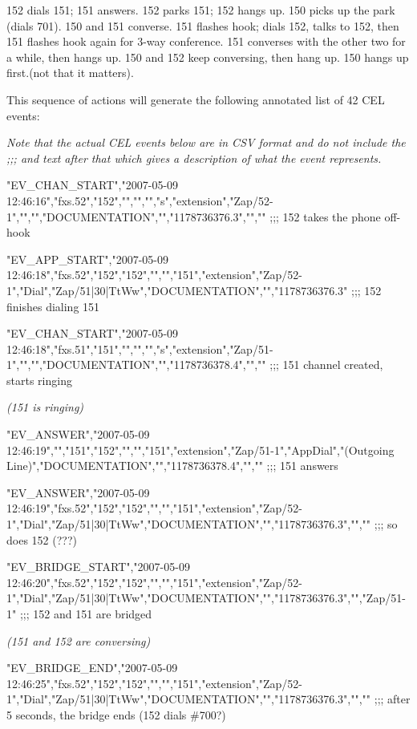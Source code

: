 152 dials 151; 151 answers.  152 parks 151; 152 hangs up.  150 picks up the park
(dials 701).  150 and 151 converse.  151 flashes hook; dials 152, talks to 152,
then 151 flashes hook again for 3-way conference. 151 converses with the other
two for a while, then hangs up. 150 and 152 keep conversing, then hang up. 150
hangs up first.(not that it matters).

This sequence of actions will generate the following annotated list of 42 CEL
events:

{\it Note that the actual CEL events below are in CSV format and do not include
     the ;;; and text after that which gives a description of what the event
     represents.}

\begin{astlisting}
"EV\_CHAN\_START","2007-05-09 12:46:16","fxs.52","152","","","","s","extension","Zap/52-1","","","DOCUMENTATION","","1178736376.3","",""                                   ;;; 152 takes the phone off-hook

"EV\_APP\_START","2007-05-09 12:46:18","fxs.52","152","152","","","151","extension","Zap/52-1","Dial","Zap/51|30|TtWw","DOCUMENTATION","","1178736376.3"                   ;;; 152 finishes dialing 151

"EV\_CHAN\_START","2007-05-09 12:46:18","fxs.51","151","","","","s","extension","Zap/51-1","","","DOCUMENTATION","","1178736378.4","",""                                   ;;; 151 channel created, starts ringing

{\it (151 is ringing)}

"EV\_ANSWER","2007-05-09 12:46:19","","151","152","","","151","extension","Zap/51-1","AppDial","(Outgoing Line)","DOCUMENTATION","","1178736378.4","",""                  ;;; 151 answers

"EV\_ANSWER","2007-05-09 12:46:19","fxs.52","152","152","","","151","extension","Zap/52-1","Dial","Zap/51|30|TtWw","DOCUMENTATION","","1178736376.3","",""                ;;; so does 152 (???)

"EV\_BRIDGE\_START","2007-05-09 12:46:20","fxs.52","152","152","","","151","extension","Zap/52-1","Dial","Zap/51|30|TtWw","DOCUMENTATION","","1178736376.3","","Zap/51-1"  ;;; 152 and 151 are bridged

{\it (151 and 152 are conversing)}

"EV\_BRIDGE\_END","2007-05-09 12:46:25","fxs.52","152","152","","","151","extension","Zap/52-1","Dial","Zap/51|30|TtWw","DOCUMENTATION","","1178736376.3","",""            ;;; after 5 seconds, the bridge ends (152 dials \#700?)


\end{astlisting}
